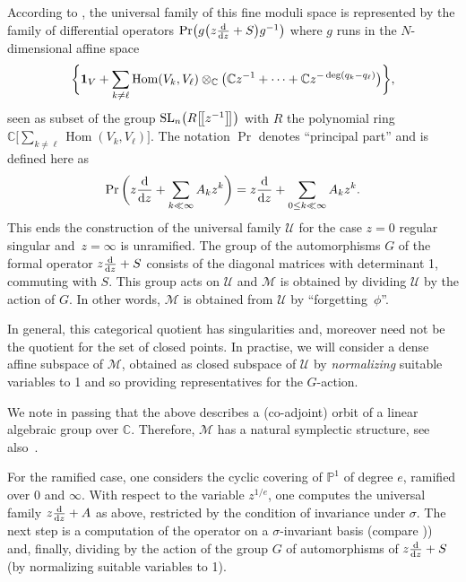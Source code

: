 \documentclass[10pt,a4paper]{amsart}
\numberwithin{equation}{section}
\begin{document}
 According to \cite[Corollary 12.15 and its proof]{vdP-Si}, the universal family of this fine moduli space is represented by the
family of differential operators $\operatorname{Pr}\bigl(g\bigl(z\frac{{\rm d}}{{\rm d}z}+S\bigr)g^{-1}\bigr)$ where $g$ runs in the $N$-dimensional affine space
\[ \bigg\{{\bf 1}_V+\sum _{k\neq \ell} \operatorname{Hom}(V_k,V_\ell)\otimes _{\mathbb{C}}\bigl(\mathbb{C}z^{-1}+\cdots +\mathbb{C}z^{-\deg (q_k-q_\ell )} \bigr)\bigg\},\]
seen as subset of the group ${\rm SL}_n\bigl(R\bigl[\!\bigl[z^{-1}\bigr]\!\bigr]\bigr)$ with
$R$ the polynomial ring $\mathbb{C}\bigl[\sum _{k\neq \ell}\operatorname{Hom}(V_k,V_{\ell})\bigr]$.
The notation $\operatorname{Pr}$ denotes ``principal part'' and is defined here as
\[\operatorname{Pr}\bigg(z\frac{{\rm d}}{{\rm d}z}+\sum _{k \ll \infty }A_kz^k\bigg)=z\frac{{\rm d}}{{\rm d}z}+\sum _{0 \leq k \ll \infty}A_kz^k.\]
This ends the construction of the universal family $\mathcal{U}$ for the case $z=0$ regular singular and~${z=\infty}$ is unramified.
The group of the automorphisms $G$ of the formal operator $z\frac{{\rm d}}{{\rm d}z}+S$ consists of the diagonal matrices with
 determinant 1, commuting with $S$. This group acts on $\mathcal{U}$ and $\mathcal{M}$ is obtained by dividing $\mathcal{U}$ by the action of $G$.
In other words, $\mathcal{M}$ is obtained from $\mathcal{U}$ by ``forgetting~$\phi$''.

 In general, this categorical quotient has singularities and, moreover need not be the quotient for the set of closed points.
In practise, we will consider a dense affine subspace of $\mathcal{M}$, obtained as closed subspace of $\mathcal{U}$ by
 {\it normalizing} suitable variables to 1 and so providing representatives for the $G$-action.

We note in passing that the above describes a (co-adjoint) orbit of a linear algebraic group over $\mathbb{C}$. Therefore,
$\mathcal{M}$ has a natural symplectic structure, see also~\cite{Bo}.

For the ramified case, one considers the cyclic covering of $\mathbb{P}^1$ of degree $e$, ramified over $0$ and $\infty$.
With respect to the variable $z^{1/e}$, one computes the universal family $z\frac{{\rm d}}{{\rm d}z}+A$ as above, restricted by the
condition of invariance under $\sigma$. The next step
is a computation of the operator on a $\sigma$-invariant basis (compare \cite[Section~12.5]{vdP-Si})) and, finally, dividing by
the action of the group $G$ of automorphisms of $z\frac{{\rm d}}{{\rm d}z}+S$ (by normalizing suitable variables to 1).
\end{document}

